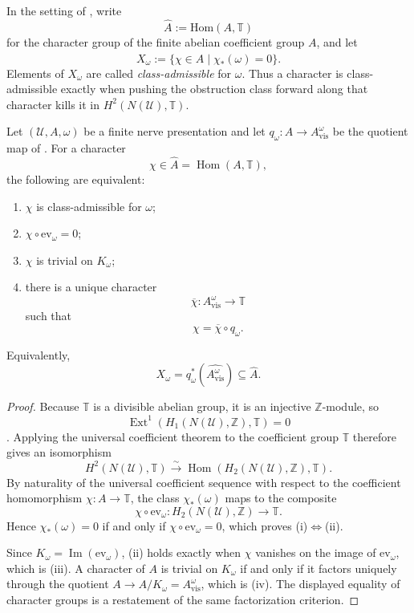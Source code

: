 \begin{definition}\label{def:class-admissible-character}
In the setting of , write
\[
\widehat A:=\mathrm{Hom}(A,\mathbb T)
\]
for the character group of the finite abelian coefficient group $A$, and let
\[
X_{\omega}:=\{\chi\in\widehat A\mid \chi_*(\omega)=0\}.
\]
Elements of $X_{\omega}$ are called \emph{class-admissible} for $\omega$. Thus
a character is class-admissible exactly when pushing the obstruction class
forward along that character kills it in $H^2(N(\mathcal U),\mathbb T)$.
\end{definition}

\begin{theorem}\label{thm:intrinsic-visible-quotient}
Let $(\mathcal U,A,\omega)$ be a finite nerve presentation and let
$q_{\omega}:A\to A_{\mathrm{vis}}^{\omega}$ be the quotient map of
. For a character
\[
\chi\in \widehat A=\operatorname{Hom}(A,\mathbb T),
\]
the following are equivalent:
\begin{enumerate}[label=(\roman*),nosep]
\item $\chi$ is class-admissible for $\omega$;
\item $\chi\circ \mathrm{ev}_{\omega}=0$;
\item $\chi$ is trivial on $K_{\omega}$;
\item there is a unique character
\[
\overline\chi:A_{\mathrm{vis}}^{\omega}\to\mathbb T
\]
such that
\[
\chi=\overline\chi\circ q_{\omega}.
\]
\end{enumerate}
Equivalently,
\[
X_{\omega}=q_{\omega}^*(\widehat{A_{\mathrm{vis}}^{\omega}})
\subseteq \widehat A.
\]
\end{theorem}

\begin{proof}
Because $\mathbb T$ is a divisible abelian group, it is an injective
$\mathbb Z$-module, so
\[
\operatorname{Ext}^1(H_1(N(\mathcal U),\mathbb Z),\mathbb T)=0
\]
\cite[Cor.~2.3.15]{Weibel1994}. Applying the universal coefficient theorem to
the coefficient group $\mathbb T$ therefore gives an isomorphism
\[
H^2(N(\mathcal U),\mathbb T)
\xrightarrow{\sim}
\operatorname{Hom}(H_2(N(\mathcal U),\mathbb Z),\mathbb T).
\]
By naturality of the universal coefficient sequence with respect to the
coefficient homomorphism $\chi:A\to\mathbb T$, the class $\chi_*(\omega)$ maps
to the composite
\[
\chi\circ \mathrm{ev}_{\omega}:H_2(N(\mathcal U),\mathbb Z)\to \mathbb T.
\]
Hence $\chi_*(\omega)=0$ if and only if
$\chi\circ \mathrm{ev}_{\omega}=0$, which proves
\textup{(i)}$\Leftrightarrow$\textup{(ii)}.

Since $K_{\omega}=\operatorname{Im}(\mathrm{ev}_{\omega})$,
\textup{(ii)} holds exactly when $\chi$ vanishes on the image of
$\mathrm{ev}_{\omega}$, which is \textup{(iii)}. A character of $A$ is trivial
on $K_{\omega}$ if and only if it factors uniquely through the quotient
$A\to A/K_{\omega}=A_{\mathrm{vis}}^{\omega}$, which is \textup{(iv)}.
The displayed equality of character groups is a restatement of the same
factorization criterion.
\end{proof}

